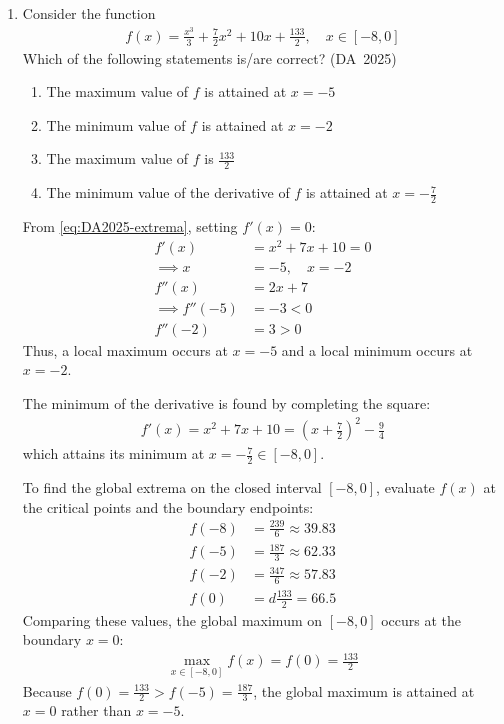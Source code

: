 \begin{enumerate}[label=\thesubsection.\arabic*, ref=\thesubsection.\theenumi]
The following code verifies our answer
\begin{lstlisting}[frame=single, basicstyle=\rmfamily, escapeinside={(*@}{@*)}]
(*@\makebox[\dimexpr\linewidth-2\fboxsep-2\fboxrule\relax][c]{codes/q29/q29.py}@*)
\end{lstlisting}
\item Consider the function
\begin{align}
	f(x) = \frac{x^3}{3} + \frac{7}{2}x^2 + 10x + \frac{133}{2}, \quad x \in [-8, 0] \label{eq:DA-2025-33-1}
\end{align}
Which of the following statements is/are correct?
\hfill (DA~2025)
\begin{enumerate}
	\item The maximum value of $f$ is attained at $x = -5$
	\item The minimum value of $f$ is attained at $x = -2$
	\item The maximum value of $f$ is $\frac{133}{2}$
	\item The minimum value of the derivative of $f$ is attained at $x = -\frac{7}{2}$
\end{enumerate}
\solution From \eqref{eq:DA2025-extrema}, setting $f'(x) = 0$:
\begin{align}
	f'(x) &= x^2 + 7x + 10 = 0 \label{eq:DA-2025-33-2}
	\\
	\implies x &= -5, \quad x = -2 \label{eq:DA-2025-33-3}
	\\
	f''(x) &= 2x + 7 \label{eq:DA-2025-33-4}
	\\
	\implies f''(-5) &= -3 < 0 \label{eq:DA-2025-33-5}
	\\
	f''(-2) &= 3 > 0 \label{eq:DA-2025-33-6}
\end{align}
Thus, a local maximum occurs at $x = -5$ and a local minimum occurs at $x = -2$. 

The minimum of the derivative is found by completing the square:
\begin{align}
	f'(x) = x^2 + 7x + 10 = \left(x + \frac{7}{2}\right)^2 - \frac{9}{4}
\end{align}
which attains its minimum at $x = -\frac{7}{2} \in [-8, 0]$. 

To find the global extrema on the closed interval $[-8, 0]$, evaluate $f(x)$ at the critical points and the boundary endpoints:
\begin{align}
	f(-8) &= \frac{239}{6} \approx 39.83
	\\
	f(-5) &= \frac{187}{3} \approx 62.33
	\\
	f(-2) &= \frac{347}{6} \approx 57.83
	\\
	f(0) &= d\frac{133}{2} = 66.5 \label{eq:DA-2025-33-max}
\end{align}
Comparing these values, the global maximum on $[-8, 0]$ occurs at the boundary $x = 0$:
\begin{align}
	\max_{x \in [-8, 0]} f(x) = f(0) = \frac{133}{2}
\end{align}
Because $f(0) = \frac{133}{2} > f(-5) = \frac{187}{3}$, the global maximum is attained at $x = 0$ rather than $x = -5$.


\end{enumerate}
